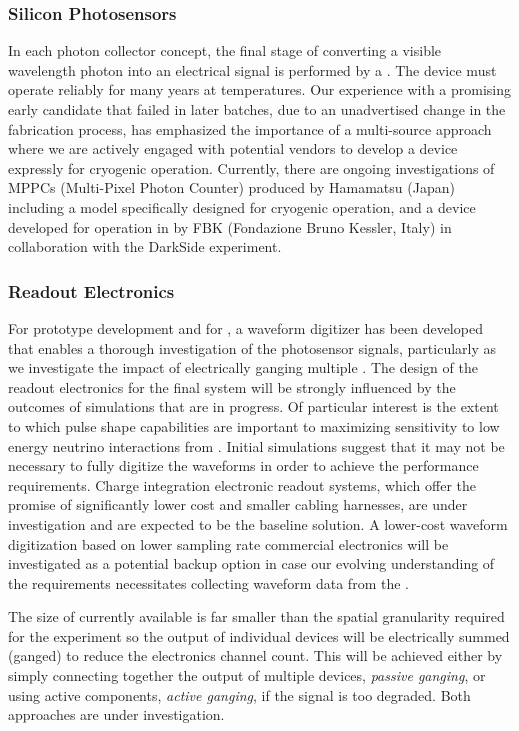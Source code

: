 \subsubsection{Silicon Photosensors} 
In each photon collector concept, the final stage of converting a visible wavelength photon into an electrical signal is performed by a . The device must operate reliably for many years at \lar temperatures.
Our experience with a promising early candidate that failed in later batches, due to an unadvertised change in the fabrication process, has emphasized the importance of a multi-source approach where we are actively engaged with potential vendors to develop a device expressly for cryogenic operation. Currently, there are ongoing investigations of MPPCs (Multi-Pixel Photon Counter) produced by Hamamatsu (Japan) including a model specifically designed for cryogenic operation, and a device developed for operation in \lar by FBK (Fondazione Bruno Kessler, Italy) in collaboration with the DarkSide experiment.

\subsubsection{Readout Electronics} 
For prototype development and for , a waveform digitizer has been developed that enables a thorough investigation of the photosensor signals, particularly as we investigate the impact of electrically ganging multiple . The design of the readout electronics for the final system will be strongly influenced by the outcomes of  simulations that are in progress. Of particular interest is the extent to which pulse  shape capabilities are important to maximizing sensitivity to low energy neutrino interactions from . 
Initial  simulations suggest that it may not be necessary to fully digitize the  waveforms in order to achieve the  performance requirements.  Charge integration electronic readout systems, which offer the promise of significantly lower cost and smaller cabling harnesses, are under investigation and are expected to be the baseline solution.
A lower-cost waveform digitization based on lower sampling rate commercial electronics will be investigated as a potential backup option in case our evolving understanding of the requirements necessitates collecting waveform data from the .

The size of currently available  is far smaller than the spatial granularity required for the experiment so the output of individual devices will be electrically summed (ganged) to reduce the electronics channel count. This will be achieved either by simply connecting together the output of multiple devices, \textit{passive ganging}, or using active components, \textit{active ganging}, if the signal is too degraded. Both approaches are under investigation. 

